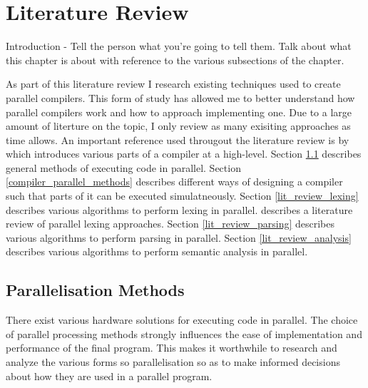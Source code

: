 \chapter{Literature Review} \label{litreview}
\begin{sectionplan}
Introduction - Tell the person what you're going to tell them. Talk about what
this chapter is about with reference to the various subsections of the chapter.
\end{sectionplan}

As part of this literature review I research existing techniques used to create
parallel compilers. This form of study has allowed me to better understand how
parallel compilers work and how to approach implementing one. Due to a large
amount of literture on the topic, I only review as many exisiting approaches
as time allows. An important reference used througout the literature review is by
\cite{scott_programming_2015}  which introduces various parts of a compiler at
a high-level.
\newline \newline
Section \ref{parallelisation_methods} describes general methods of executing
code in parallel.
\newline \newline
Section \ref{compiler_parallel_methods} describes different ways of designing a compiler
such that parts of it can be executed simulatneously.
\newline \newline
Section \ref{lit_review_lexing} describes various algorithms to perform lexing
in parallel. \cite{pai_t_systematic_2020} describes a literature review of parallel lexing
approaches.
\newline \newline
Section \ref{lit_review_parsing} describes various algorithms to perform parsing
in parallel.
\newline \newline
Section \ref{lit_review_analysis} describes various algorithms to perform semantic
analysis in parallel.
\newline \newline

\section{Parallelisation Methods} \label{parallelisation_methods}
There exist various hardware solutions for executing code in parallel.
The choice of parallel processing methods strongly influences the ease of
implementation and performance of the final program. This makes it worthwhile to
research and analyze the various forms so parallelisation so as to make informed
decisions about how they are used in a parallel program.

